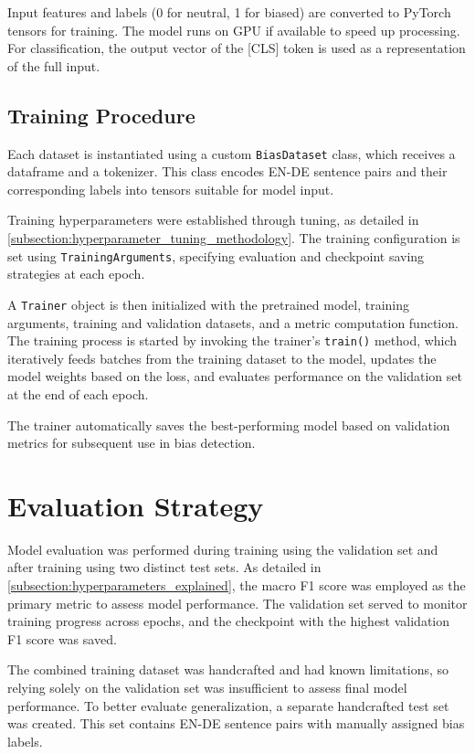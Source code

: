     Input features and labels (0 for neutral, 1 for biased) are converted to PyTorch tensors for training. The model runs on GPU if available to speed up processing. For classification, the output vector of the [CLS] token is used as a representation of the full input.

\subsection{Training Procedure}
    Each dataset is instantiated using a custom \texttt{BiasDataset} class, which receives a dataframe and a tokenizer. This class encodes EN-DE sentence pairs and their corresponding labels into tensors suitable for model input.

    Training hyperparameters were established through tuning, as detailed in \autoref{subsection:hyperparameter_tuning_methodology}. The training configuration is set using \texttt{TrainingArguments}, specifying evaluation and checkpoint saving strategies at each epoch.

    A \texttt{Trainer} object is then initialized with the pretrained model, training arguments, training and validation datasets, and a metric computation function. The training process is started by invoking the trainer's \texttt{train()} method, which iteratively feeds batches from the training dataset to the model, updates the model weights based on the loss, and evaluates performance on the validation set at the end of each epoch.

    The trainer automatically saves the best-performing model based on validation metrics for subsequent use in bias detection.

\section{Evaluation Strategy}
    Model evaluation was performed during training using the validation set and after training using two distinct test sets. As detailed in \autoref{subsection:hyperparameters_explained}, the macro F1 score was employed as the primary metric to assess model performance. The validation set served to monitor training progress across epochs, and the checkpoint with the highest validation F1 score was saved.

    The combined training dataset was handcrafted and had known limitations, so relying solely on the validation set was insufficient to assess final model performance. To better evaluate generalization, a separate handcrafted test set was created. This set contains EN-DE sentence pairs with manually assigned bias labels.

